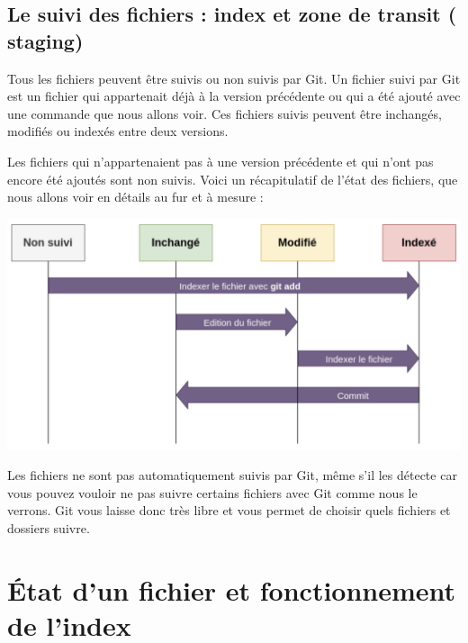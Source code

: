 \documentclass{article}
\begin{document}
\subsection{Le suivi des fichiers : {\color{blue} index} et zone de transit ({\color{blue} staging})}
Tous les fichiers peuvent être suivis ou non suivis par {\color{blue} Git}. Un fichier suivi par {\color{blue} Git} est un fichier qui appartenait déjà à la version précédente ou qui a été ajouté avec une commande que nous allons voir. Ces fichiers suivis peuvent être inchangés, modifiés ou indexés entre deux versions.

Les fichiers qui n'appartenaient pas à une version précédente et qui n'ont pas encore été ajoutés sont non suivis. Voici un récapitulatif de l'état des fichiers, que nous allons voir en détails au fur et à mesure :
\begin{center}
\includegraphics[scale=0.13]{image01.png} 
\end{center}


Les fichiers ne sont pas automatiquement suivis par {\color{blue} Git}, même s'il les détecte car vous pouvez vouloir ne pas suivre certains fichiers avec {\color{blue} Git} comme nous le verrons. {\color{blue} Git} vous laisse donc très libre et vous permet de choisir quels fichiers et dossiers suivre.

\section{État d'un fichier et fonctionnement de l'index}
\end{document}
